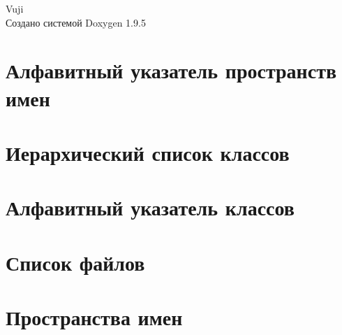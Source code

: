 \documentclass[twoside]{book}
\newcommand{\+}{\discretionary{\mbox{\scriptsize$\hookleftarrow$}}{}{}}
\newcommand{\clearemptydoublepage}{%
    \newpage{\pagestyle{empty}\cleardoublepage}%
  }
\begin{document}
  \raggedbottom
    \hypersetup{pageanchor=false,
                bookmarksnumbered=true,
                pdfencoding=unicode
               }
  \begin{titlepage}
  \vspace*{7cm}
  \begin{center}%
  {\Large Vuji}\\
  \vspace*{1cm}
  {\large Создано системой Doxygen 1.9.5}\\
  \end{center}
  \end{titlepage}
  \clearemptydoublepage
  \tableofcontents
  \clearemptydoublepage
  \hypersetup{pageanchor=true}
\chapter{Алфавитный указатель пространств имен}

\chapter{Иерархический список классов}

\chapter{Алфавитный указатель классов}

\chapter{Список файлов}

\chapter{Пространства имен}




\end{document}
